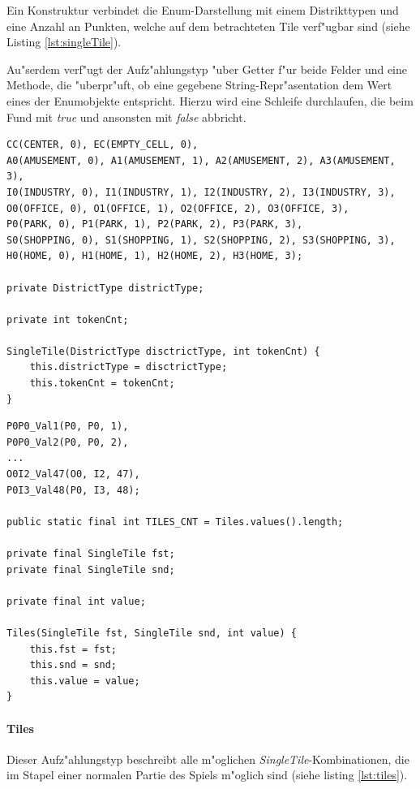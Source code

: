Ein Konstruktur verbindet die Enum-Darstellung mit einem Distrikttypen und eine Anzahl an Punkten, welche auf dem betrachteten Tile verf"ugbar sind (siehe Listing \ref{lst:singleTile}).

Au"serdem verf"ugt der Aufz"ahlungstyp "uber Getter f"ur beide Felder und eine Methode, die "uberpr"uft, ob eine gegebene String-Repr"asentation dem Wert eines der Enumobjekte entspricht. Hierzu wird eine Schleife durchlaufen, die beim Fund mit \emph{true} und ansonsten mit \emph{false} abbricht. 

\begin{lstlisting}[style=CodeHighlighting,float,caption=singleTile,label=lst:singleTile]
CC(CENTER, 0), EC(EMPTY_CELL, 0),
A0(AMUSEMENT, 0), A1(AMUSEMENT, 1), A2(AMUSEMENT, 2), A3(AMUSEMENT, 3),
I0(INDUSTRY, 0), I1(INDUSTRY, 1), I2(INDUSTRY, 2), I3(INDUSTRY, 3),
O0(OFFICE, 0), O1(OFFICE, 1), O2(OFFICE, 2), O3(OFFICE, 3),
P0(PARK, 0), P1(PARK, 1), P2(PARK, 2), P3(PARK, 3),
S0(SHOPPING, 0), S1(SHOPPING, 1), S2(SHOPPING, 2), S3(SHOPPING, 3),
H0(HOME, 0), H1(HOME, 1), H2(HOME, 2), H3(HOME, 3);

private DistrictType districtType;

private int tokenCnt;

SingleTile(DistrictType disctrictType, int tokenCnt) {
    this.districtType = disctrictType;
    this.tokenCnt = tokenCnt;
}
\end{lstlisting}

\begin{lstlisting}[style=CodeHighlighting,float,caption=Tiles,label=lst:tiles]
P0P0_Val1(P0, P0, 1),
P0P0_Val2(P0, P0, 2),
...
O0I2_Val47(O0, I2, 47),
P0I3_Val48(P0, I3, 48);

public static final int TILES_CNT = Tiles.values().length;

private final SingleTile fst;
private final SingleTile snd;

private final int value;

Tiles(SingleTile fst, SingleTile snd, int value) {
    this.fst = fst;
    this.snd = snd;
    this.value = value;
}
\end{lstlisting}

\clearpage
\paragraph{Tiles}
\label{par:tiles}
Dieser Aufz"ahlungstyp beschreibt alle m"oglichen \emph{SingleTile}-Kombinationen, die im Stapel einer normalen Partie des Spiels m"oglich sind (siehe listing \ref{lst:tiles}). 

